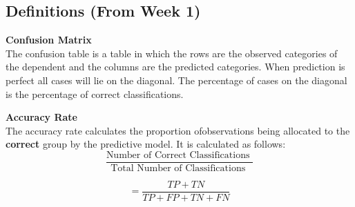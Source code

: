 \documentclass[a4paper,12pt]{article}
\begin{document}
\newpage
\subsection{Definitions (From Week 1)}
\textbf{Confusion Matrix} \\
The confusion
table is a table in which the rows are the observed categories of the dependent and
the columns are the predicted categories. When prediction is perfect all cases will lie on the
diagonal. The percentage of cases on the diagonal is the percentage of correct classifications. 

\textbf{Accuracy Rate}\\
The accuracy rate calculates the proportion ofobservations being allocated to the \textbf{correct} group by the predictive model. It is calculated as follows:
\[ \frac{
\mbox{Number of Correct Classifications }}{\mbox{Total Number of Classifications }} \]

\[ = \frac{TP + TN}{TP+FP+TN+FN}\]

\medskip
\end{document}
